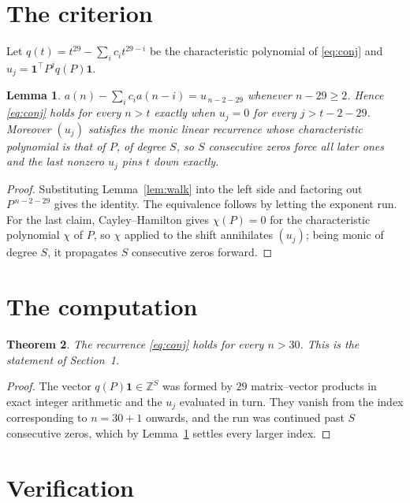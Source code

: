 \documentclass[11pt,a4paper]{article}
\theoremstyle{plain}
\newtheorem{theorem}{Theorem}
\newtheorem{lemma}[theorem]{Lemma}
\theoremstyle{definition}
\begin{document}
\section{The criterion}

Let $q(t)=t^{29}-\sum_i c_i t^{29-i}$ be the characteristic polynomial of
\eqref{eq:conj} and $u_j=\mathbf{1}^{\!\top}P^{j}q(P)\mathbf{1}$.

\begin{lemma}\label{lem:crit}
$a(n)-\sum_i c_i a(n-i)=u_{\,n-2-29}$ whenever $n-29\ge2$. Hence
\eqref{eq:conj} holds for every $n>t$ exactly when $u_j=0$ for every
$j>t-2-29$. Moreover $(u_j)$ satisfies the monic linear recurrence whose
characteristic polynomial is that of $P$, of degree $S$, so $S$ consecutive zeros force all
later ones and the last nonzero $u_j$ pins $t$ down exactly.
\end{lemma}

\begin{proof}
Substituting Lemma~\ref{lem:walk} into the left side and factoring out
$P^{\,n-2-29}$ gives the identity. The equivalence follows by letting the exponent
run. For the last claim, Cayley--Hamilton gives $\chi(P)=0$ for the characteristic
polynomial $\chi$ of $P$, so $\chi$ applied to the shift annihilates $(u_j)$; being monic of
degree $S$, it propagates $S$ consecutive zeros forward.
\end{proof}

\section{The computation}

\begin{theorem}
The recurrence \eqref{eq:conj} holds for every $n>30$. This is the statement of
Section~1.
\end{theorem}

\begin{proof}
The vector $q(P)\mathbf{1}\in\mathbb{Z}^{S}$ was formed by $29$ matrix--vector
products in exact integer arithmetic and the $u_j$ evaluated in turn. They vanish from the
index corresponding to $n=30+1$ onwards, and the run was continued past $S$ consecutive
zeros, which by Lemma~\ref{lem:crit} settles every larger index.
\end{proof}

\section{Verification}
\end{document}
